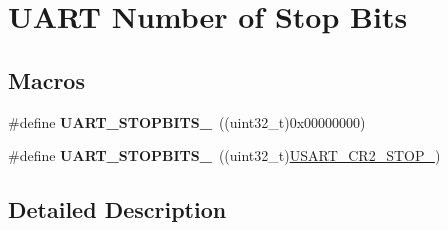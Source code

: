 \hypertarget{group___u_a_r_t___stop___bits}{}\section{U\+A\+RT Number of Stop Bits}
\label{group___u_a_r_t___stop___bits}
\subsection*{Macros}
\begin{DoxyCompactItemize}
\item 
\#define {\bfseries U\+A\+R\+T\+\_\+\+S\+T\+O\+P\+B\+I\+T\+S\+\_}~((uint32\+\_\+t)0x00000000)\hypertarget{group___u_a_r_t___stop___bits_ga7cf97e555292d574de8abc596ba0e2ce}{}\label{group___u_a_r_t___stop___bits_ga7cf97e555292d574de8abc596ba0e2ce}

\item 
\#define {\bfseries U\+A\+R\+T\+\_\+\+S\+T\+O\+P\+B\+I\+T\+S\+\_}~((uint32\+\_\+t)\hyperlink{group___peripheral___registers___bits___definition_ga2b24d14f0e5d1c76c878b08aad44d02b}{U\+S\+A\+R\+T\+\_\+\+C\+R2\+\_\+\+S\+T\+O\+P\+\_})\hypertarget{group___u_a_r_t___stop___bits_ga91616523380f7450aac6cb7e17f0c0f2}{}\label{group___u_a_r_t___stop___bits_ga91616523380f7450aac6cb7e17f0c0f2}

\end{DoxyCompactItemize}


\subsection{Detailed Description}
